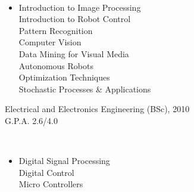 \documentclass[margin]{res}
\begin{document}
\begin{resume}
		\hspace{.08in}{\bf Subjects}\vspace{-.15in}\\
		\begin{itemize}
			\item[] Introduction to Image Processing \\
			Introduction to Robot Control\\
			Pattern Recognition \\
			Computer Vision \\
			Data Mining for Visual Media \\
			Autonomous Robots \\
			Optimization Techniques \\
			Stochastic Processes \& Applications
		\end{itemize}
		
		{Electrical and Electronics Engineering (BSc), 2010\\G.P.A. 2.6/4.0}

		\hspace{.08in}{\bf Subjects}\vspace{-.15in}\\
		\begin{itemize}
			\item[] Digital Signal Processing \\
			Digital Control \\
			Micro Controllers
		\end{itemize}


\end{resume}
\end{document}
